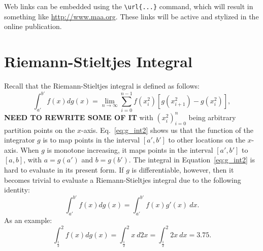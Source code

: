 \documentclass{article}
\theoremstyle{theorem}
\theoremstyle{definition}
\begin{document}
Web links can be embedded using the \verb~\url{...}~ command, which will result in something like \url{http://www.maa.org}.  These links will be active and stylized in the online publication.

\section{Riemann-Stieltjes Integral}
Recall that the Riemann-Stieltjes integral is defined as follows:
\begin{equation}
\label{eq:g_int2}
\int_{a'}^{b'} f(x) dg(x) =  \lim_{n \rightarrow \infty}\sum_{i=0}^{n-1} f(x_i^2)[g(x_{i+1}^2)-g(x_{i}^2)], 
\end{equation}
\noindent
\textbf{NEED TO REWRITE SOME OF IT} with $(x_i^2)_{i=0}^n$ being arbitrary partition points on the $x$-axis. Eq.~\eqref{eq:g_int2} shows us that the function of the integrator $g$ is to
map points in the interval $[a',b']$ to other locations on the $x$-axis. When $g$ is monotone increasing, it maps points in the interval $[a',b']$ to $[a,b]$,
with $a = g(a')$ and $b = g(b')$. The integral in Equation~\ref{eq:g_int2} is hard to evaluate in its present form. If $g$ is differentiable, however, then it becomes trivial to 
evaluate a Riemann-Stieltjes integral due to the following identity:
\begin{equation}
\int_{a'}^{b'} f(x) dg(x) = \int_{a'}^{b'} f(x)g'(x)~dx.
\end{equation}
As an example:
\begin{equation}
\int_{\frac{1}{2}}^{2} f(x) dg(x)=\int_{\frac{1}{2}}^2 x~d2x = \int_{\frac{1}{2}}^2 2x~dx = 3.75. 
\end{equation}
\end{document}
